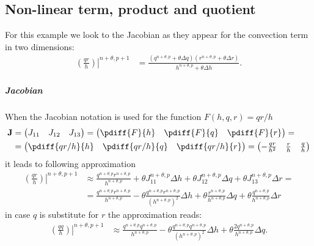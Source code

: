 \subsection{Non-linear term, product and quotient}
For this example we look  to the Jacobian as they appear for the convection term in two dimensions:
\begin{align}
    \left.\left(\frac{qr}{h}\right)\right|^{n+\theta, p+1} & = \frac{ \left(q^{n+\theta, p} + \theta  \Delta q\right)\left( r^{n+\theta, p} + \theta  \Delta r \right) }{ h^{n+\theta, p} + \theta  \Delta h}.
\end{align}

\subparagraph*{Jacobian}
When the Jacobian notation is  used for the function $F(h,q, r) = qr/h$
\begin{align}
    \mat{J} & =
    \begin{pmatrix}
        J_{11} & J_{12} & J_{13}
    \end{pmatrix}
    =
    \begin{pmatrix}
        \pdiff{F}{h} & \pdiff{F}{q} & \pdiff{F}{r}
    \end{pmatrix}
    =
    \\
    & = \begin{pmatrix}
        \pdiff{qr/h}{h} & \pdiff{qr/h}{q} & \pdiff{qr/h}{r}
    \end{pmatrix}
    =
    \begin{pmatrix}
        -\frac{qr}{h^2} & \frac{r}{h} & \frac{q}{h}
    \end{pmatrix}
\end{align}
it leads to following approximation
\begin{align}
    \left.\left(\frac{qr}{h}\right)\right|^{n+\theta, p+1} &  \approx  \frac{q^{n+\theta, p}r^{n+\theta, p}}{h^{n+\theta, p}} + \theta J_{11}^{n+\theta, p} \Delta h + \theta J_{12}^{n+\theta, p} \Delta q + \theta J_{13}^{n+\theta, p} \Delta r=
    \\
    & = \frac{q^{n+\theta, p}r^{n+\theta, p}}{h^{n+\theta, p}} - \theta \frac{q^{n+\theta, p}r^{n+\theta, p}}{(h^{n+\theta, p})^2} \Delta h + \theta \frac{r^{n+\theta, p}}{h^{n+\theta, p}} \Delta q + \theta \frac{q^{n+\theta, p}}{h^{n+\theta, p}} \Delta r \label{eq:2d_convection_q_equation}
\end{align}
in case $q$ is substitute for $r$ the approximation reads:
\begin{align}
    \left.\left(\frac{qq}{h}\right)\right|^{n+\theta, p+1} &  \approx
\frac{q^{n+\theta, p}q^{n+\theta, p}}{h^{n+\theta, p}} - \theta \frac{q^{n+\theta, p}q^{n+\theta, p}}{(h^{n+\theta, p})^2} \Delta h + \theta \frac{2 q^{n+\theta, p}}{h^{n+\theta, p}} \Delta q.
\end{align}

